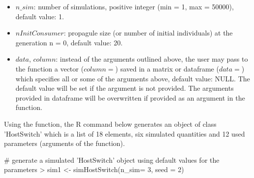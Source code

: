 \begin{itemize}
    \item $n\_sim$: number of simulations, positive integer (min = 1, max = 50000), default value: 1.
    \item $nInitConsumer$: propagule size (or number of initial individuals) at the generation n = 0, default value: 20.
    \item $data$, $column$: instead of the arguments outlined above, the user may pass to the function a vector ($column=$) saved in a matrix or dataframe ($data=$) which specifies all or some of the arguments above, default value: NULL. The default value will be set if the argument is not provided. The arguments provided in dataframe will be overwritten if provided as an argument in the  function.
\end{itemize}
Using the  function, the R command below generates an object of class 'HostSwitch' which is a list of 18 elements, six simulated quantities and 12 used parameters (arguments of the function).

\begin{example}
 # generate a simulated 'HostSwitch' object using default values for the parameters
 > sim1 <- simHostSwitch(n_sim= 3, seed = 2)
\end{example}

